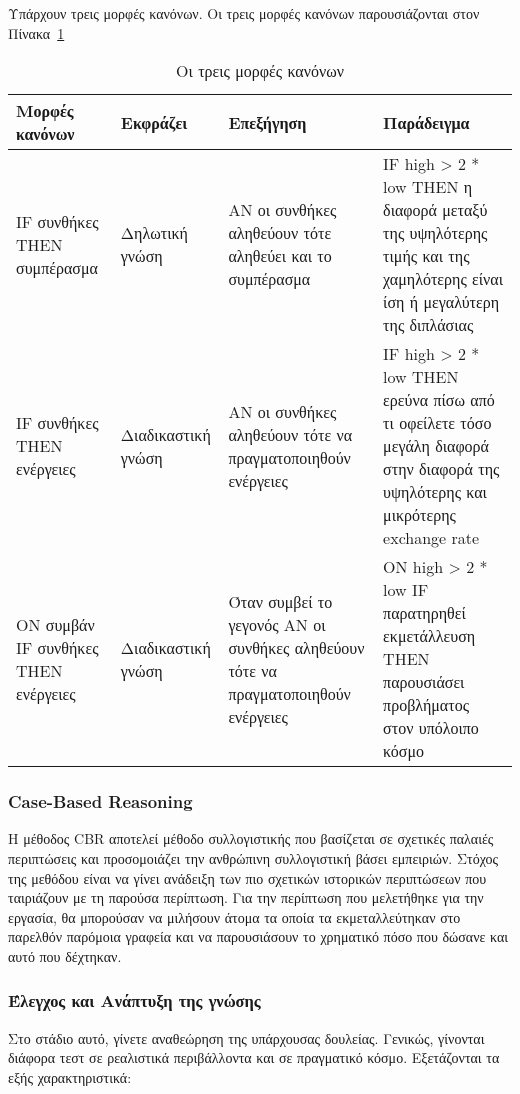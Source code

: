 Υπάρχουν τρεις μορφές κανόνων. Οι τρεις μορφές κανόνων παρουσιάζονται στον Πίνακα~\ref{tab:rules}

\begin{table}[H]
  \centering
  \begin{tabular}{| p{3cm} | p{2cm} | p{4cm} | p{5cm} |}
    \hline
    \textbf{Μορφές κανόνων} & \textbf{Εκφράζει} & \textbf{Επεξήγηση} & \textbf{Παράδειγμα} \\
    \hline
    IF συνθήκες THEN συμπέρασμα & Δηλωτική γνώση & ΑΝ οι συνθήκες αληθεύουν τότε αληθεύει και το συμπέρασμα & IF high > 2 * low THEN η διαφορά μεταξύ της υψηλότερης τιμής και της χαμηλότερης είναι ίση ή μεγαλύτερη της διπλάσιας \\
    \hline
    IF συνθήκες THEN ενέργειες & Διαδικαστική γνώση & ΑΝ οι συνθήκες αληθεύουν τότε να πραγματοποιηθούν ενέργειες & IF high > 2 * low THEN ερεύνα πίσω από τι οφείλετε τόσο μεγάλη διαφορά στην διαφορά της υψηλότερης και μικρότερης exchange rate \\
    \hline
    ON συμβάν IF συνθήκες THEN ενέργειες & Διαδικαστική γνώση & Όταν συμβεί το γεγονός ΑΝ οι συνθήκες αληθεύουν τότε να πραγματοποιηθούν ενέργειες & ON high > 2 * low IF παρατηρηθεί εκμετάλλευση THEN παρουσιάσει προβλήματος στον υπόλοιπο κόσμο \\
    \hline
  \end{tabular}
  \caption{Οι τρεις μορφές κανόνων}
  \label{tab:rules}
\end{table}

\subsubsection*{Case-Based Reasoning}

Η μέθοδος CBR αποτελεί μέθοδο συλλογιστικής που βασίζεται σε σχετικές παλαιές περιπτώσεις και προσομοιάζει την ανθρώπινη συλλογιστική βάσει εμπειριών. Στόχος της μεθόδου είναι να γίνει ανάδειξη των πιο σχετικών ιστορικών περιπτώσεων που ταιριάζουν με τη παρούσα περίπτωση. Για την περίπτωση που μελετήθηκε για την εργασία, θα μπορούσαν να μιλήσουν άτομα τα οποία τα εκμεταλλεύτηκαν στο παρελθόν παρόμοια γραφεία και να παρουσιάσουν το χρηματικό πόσο που δώσανε και αυτό που δέχτηκαν.

\subsubsection{Έλεγχος και Ανάπτυξη της γνώσης}

Στο στάδιο αυτό, γίνετε αναθεώρηση της υπάρχουσας δουλείας. Γενικώς, γίνονται διάφορα τεστ σε ρεαλιστικά περιβάλλοντα και σε πραγματικό κόσμο. Εξετάζονται τα εξής χαρακτηριστικά:

